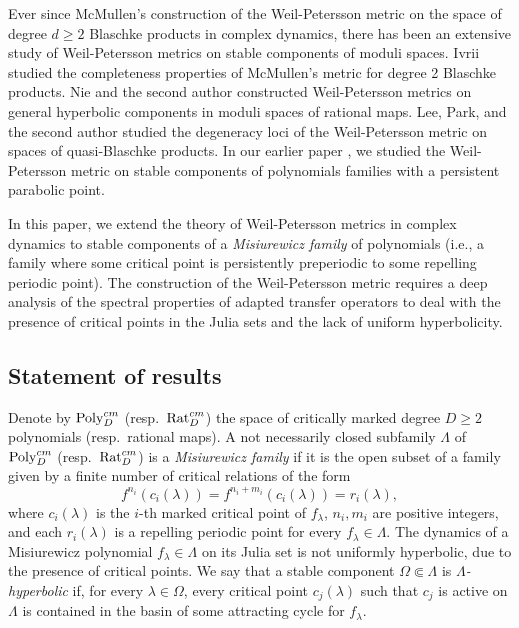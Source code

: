 \documentclass[11pt]{amsart}
\theoremstyle{plain}
\theoremstyle{definition}
\theoremstyle{remark}
\begin{document}
Ever since McMullen's \cite{McMullen08} 
construction of the Weil-Petersson metric on the space of degree $d \ge 2$ Blaschke products in complex dynamics, there has been an extensive study of Weil-Petersson metrics on stable components of moduli spaces. Ivrii \cite{Ivrii14} studied the completeness properties of McMullen's metric for degree 2 Blaschke products. 
Nie and the second author
\cite{HeNie23}
constructed Weil-Petersson metrics on general hyperbolic components in moduli spaces of rational maps. Lee, Park, and the second author
\cite{HLP23,HLP25}
studied the degeneracy
loci of the Weil-Petersson metric on spaces of quasi-Blaschke products. 
In our earlier paper \cite{BH24}, we 
studied the Weil-Petersson metric on stable components of 
polynomials families with a persistent parabolic point.

In this paper, we extend the theory of Weil-Petersson metrics in complex dynamics to stable components of a {\it Misiurewicz family} of polynomials (i.e., a family where some critical point is persistently preperiodic to some repelling periodic point).
The construction of the Weil-Petersson metric
requires a deep analysis of the
spectral properties of adapted transfer operators to deal with the presence of critical points in the Julia sets and the lack of uniform hyperbolicity.


\subsection{Statement of results}
Denote by ${\rm Poly}^{cm}_D$ (resp.\ ${\rm Rat}^{cm}_D$) the space of critically marked degree $D \ge 2$ polynomials (resp.\ rational maps). 
A not necessarily closed
subfamily $\Lambda$ of ${\rm Poly}^{cm}_D$ (resp.\ ${\rm Rat}^{cm}_D$) is a {\it Misiurewicz family} if it is the open subset of a 
family given by a finite number of 
critical relations of the form
\[
f^{n_i} (c_{i} (\lambda)) = f^{n_i+m_i} (c_{i}(\lambda)) = r_{i}(\lambda),
\]
where $c_i(\lambda)$ is the $i$-th marked critical point of $f_\lambda$, $n_i,m_i$ are positive integers,
and
each $r_{i}(\lambda)$ is a repelling periodic point for every $f_\lambda\in \Lambda$.
The dynamics of a Misiurewicz polynomial $f_\lambda \in \Lambda$ on its Julia set is not uniformly hyperbolic, due to the presence of critical points.
We say that a stable component $\Omega\Subset \Lambda$ is {\it $\Lambda$-hyperbolic} if,
for every $\lambda \in \Omega$, every critical point $c_j(\lambda)$ such that $c_j$ is active on $\Lambda$ is contained in the basin of some attracting cycle for $f_\lambda$.
\end{document}
